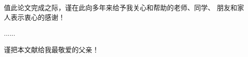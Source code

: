 ﻿
\begin{thanks}

值此论文完成之际，谨在此向多年来给予我关心和帮助的老师、同学、
朋友和家人表示衷心的感谢！

......

\vskip 18pt

谨把本文献给我最敬爱的父亲！

\end{thanks}
